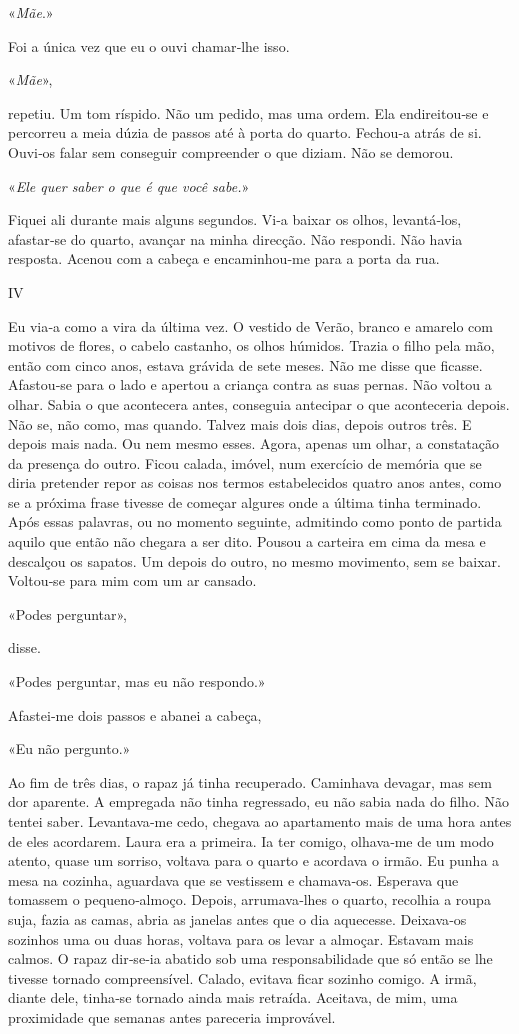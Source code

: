 «\emph{Mãe}.»

Foi a única vez que eu o ouvi chamar­‑lhe isso.

«\emph{Mãe}»,

repetiu. Um tom ríspido. Não um pedido, mas uma ordem. Ela
endireitou­‑se e percorreu a meia dúzia de passos até à porta do quarto.
Fechou­‑a atrás de si. Ouvi­‑os falar sem conseguir compreender o que
diziam. Não se demorou.

«\emph{Ele quer saber o que é que você sabe.}»

Fiquei ali durante mais alguns segundos. Vi­‑a baixar os olhos,
levantá­‑los, afastar­‑se do quarto, avançar na minha direcção. Não
respondi. Não havia resposta. Acenou com a cabeça e encaminhou­‑me para
a porta da rua.

IV

Eu via­‑a como a vira da última vez. O vestido de Verão, branco e
amarelo com motivos de flores, o cabelo castanho, os olhos húmidos.
Trazia o filho pela mão, então com cinco anos, estava grávida de sete
meses. Não me disse que ficasse. Afastou­‑se para o lado e apertou a
criança contra as suas pernas. Não voltou a olhar. Sabia o que
acontecera antes, conseguia antecipar o que aconteceria depois. Não se,
não como, mas quando. Talvez mais dois dias, depois outros três. E
depois mais nada. Ou nem mesmo esses. Agora, apenas um olhar, a
constatação da presença do outro. Ficou calada, imóvel, num exercício de
memória que se diria pretender repor as coisas nos termos estabelecidos
quatro anos antes, como se a próxima frase tivesse de começar algures
onde a última tinha terminado. Após essas palavras, ou no momento
seguinte, admitindo como ponto de partida aquilo que então não chegara a
ser dito. Pousou a carteira em cima da mesa e descalçou os sapatos. Um
depois do outro, no mesmo movimento, sem se baixar. Voltou­‑se para mim
com um ar cansado.

«Podes perguntar»,

disse.

«Podes perguntar, mas eu não respondo.»

Afastei­‑me dois passos e abanei a cabeça,

«Eu não pergunto.»

Ao fim de três dias, o rapaz já tinha recuperado. Caminhava devagar, mas
sem dor aparente. A empregada não tinha regressado, eu não sabia nada do
filho. Não tentei saber. Levantava­‑me cedo, chegava ao apartamento mais
de uma hora antes de eles acordarem. Laura era a primeira. Ia ter
comigo, olhava­‑me de um modo atento, quase um sorriso, voltava para o
quarto e acordava o irmão. Eu punha a mesa na cozinha, aguardava que se
vestissem e chamava­‑os. Esperava que tomassem o pequeno­‑almoço.
Depois, arrumava­‑lhes o quarto, recolhia a roupa suja, fazia as camas,
abria as janelas antes que o dia aquecesse. Deixava­‑os sozinhos uma ou
duas horas, voltava para os levar a almoçar. Estavam mais calmos. O
rapaz dir­‑se­‑ia abatido sob uma responsabilidade que só então se lhe
tivesse tornado compreensível. Calado, evitava ficar sozinho comigo. A
irmã, diante dele, tinha­‑se tornado ainda mais retraída. Aceitava, de
mim, uma proximidade que semanas antes pareceria improvável.

